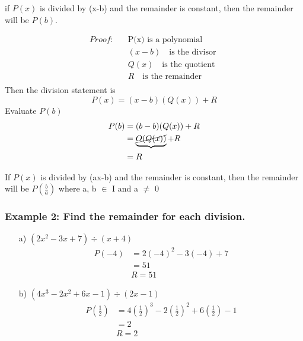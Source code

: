 \documentclass{article}
\begin{document}
\begin{tcolorbox}[enhanced,attach boxed title to top center={yshift=-3mm,yshifttext=-1mm},
  colback=antiquefuchsia!5!white,colframe=antiquefuchsia!75!black,colbacktitle=purple!80!black,
  title=The Remainder Theorm,fonttitle=\bfseries,
  boxed title style={size=small,colframe=red!50!black} ]
 if $P(x)$ is divided by (x-b) and the remainder is constant, then the remainder will be $P(b)$.
\end{tcolorbox}
\begin{align*}
    \textit{Proof:} \quad & \text{P(x) is a polynomial}\\
    &(x-b) \quad \text{is the divisor }\\
    &Q(x) \quad \text{is the quotient }\\
    & R \quad \text{is the remainder }\\
\end{align*}
Then the division statement is
$$
P(x)=(x-b)(Q(x))+R
$$
Evaluate $P(b)$
$$
\begin{aligned}
P(b) & =(b-b)(Q(x))+R \\
& =\underbrace{\cancel{O(Q(x))}}+R_{} \\ 
& =R
\end{aligned}
$$
\begin{tcolorbox}[enhanced,frame style image=blueshade.png,
  opacityback=0.75,opacitybacktitle=0.25,
  colback=blue!5!white,colframe=blue!75!black,
  title=The General Remainder Theorem]
 If $P(x)$ is divided by (ax-b) and the remainder is constant, then the remainder will be $P\left(\frac{b}{a}\right)$ where a, b $\in$ I and a $\neq$ 0
\end{tcolorbox}
\subsubsection*{Example 2: Find the remainder for each division.}
\begin{enumerate}
    \item[a)] $\left( 2x^2-3x+7\right)\div (x+4)$ \\
    \begin{align*}
    P(-4)&=2(-4)^2-3(-4)+7\\
    &=51\\
    &\boxed{R= 51}
    \end{align*}
    \item[b)] $\left( 4x^3-2x^2+6x-1\right) \div (2x-1)$ \\
    \begin{align*}
        P\left(\frac{1}{2}\right)&=4\left(\frac{1}{2}\right)^3-2\left(\frac{1}{2}\right)^2+6\left(\frac{1}{2}\right)-1\\
        &= 2\\
        &\boxed{R=2}
    \end{align*}
\end{enumerate}
\end{document}
